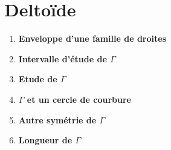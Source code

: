 \section{Deltoïde}
\begin{enumerate}
      \item \textbf{Enveloppe d'une famille de droites}
            

      \item \textbf{Intervalle d'étude de $\Gamma$}\\
            


      \item \textbf{Etude de $\Gamma$}
            


      \item \textbf{$\Gamma$ et un cercle de courbure}
            


      \item \textbf{Autre symétrie de $\Gamma$}
            


      \item \textbf{Longueur de $\Gamma$}
            
\end{enumerate}


